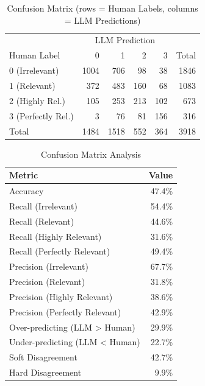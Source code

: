 \begin{table}[htbp]
\centering
\caption{Confusion Matrix (rows = Human Labels, columns = LLM Predictions)}
\label{tab:confusion-matrix}
\begin{tabular}{l|rrrr|r}
\toprule
 & \multicolumn{4}{c|}{LLM Prediction} & \\
Human Label & 0 & 1 & 2 & 3 & Total \\
\midrule
0 (Irrelevant) & 1004 & 706 & 98 & 38 & 1846 \\
1 (Relevant) & 372 & 483 & 160 & 68 & 1083 \\
2 (Highly Rel.) & 105 & 253 & 213 & 102 & 673 \\
3 (Perfectly Rel.) & 3 & 76 & 81 & 156 & 316 \\
\midrule
Total & 1484 & 1518 & 552 & 364 & 3918 \\
\bottomrule
\end{tabular}
\end{table}


\begin{table}[htbp]
\centering
\caption{Confusion Matrix Analysis}
\label{tab:confusion-analysis}
\begin{tabular}{lr}
\toprule
Metric & Value \\
\midrule
Accuracy & 47.4\% \\
\midrule
Recall (Irrelevant) & 54.4\% \\
Recall (Relevant) & 44.6\% \\
Recall (Highly Relevant) & 31.6\% \\
Recall (Perfectly Relevant) & 49.4\% \\
\midrule
Precision (Irrelevant) & 67.7\% \\
Precision (Relevant) & 31.8\% \\
Precision (Highly Relevant) & 38.6\% \\
Precision (Perfectly Relevant) & 42.9\% \\
\midrule
Over-predicting (LLM > Human) & 29.9\% \\
Under-predicting (LLM < Human) & 22.7\% \\
\midrule
Soft Disagreement & 42.7\% \\
Hard Disagreement & 9.9\% \\
\bottomrule
\end{tabular}
\end{table}